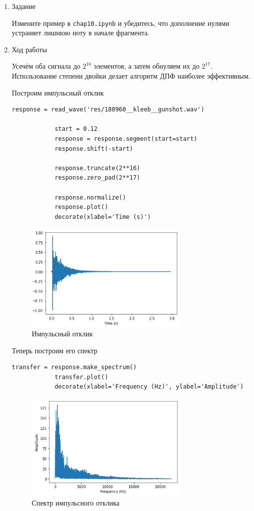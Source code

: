 \documentclass[a4paper,12pt]{article}
\begin{document}
	\begin{enumerate}
		
		\item{Задание}
		
		Измените пример в \texttt{chap10.ipynb} и убедитесь, что дополнение нулями устраняет лишнюю ноту в начале фрагмента.
		
		\item{Ход работы}
		
		Усечём оба сигнала до $2^{16}$ элементов, а затем обнуляем их до $2^{17}$. Использование степени двойки делает алгоритм ДПФ наиболее эффективным.
		
		Построим импульсный отклик
		\begin{lstlisting}[caption=Импульсный отклик]
			response = read_wave('res/180960__kleeb__gunshot.wav')
			
			start = 0.12
			response = response.segment(start=start)
			response.shift(-start)
			
			response.truncate(2**16)
			response.zero_pad(2**17)
			
			response.normalize()
			response.plot()
			decorate(xlabel='Time (s)')
		\end{lstlisting}
		\begin{figure}[H]
			\centering
			\includegraphics[width=0.75\textwidth]{1_1.png}
			\caption{Импульсный отклик}
			\label{fig:1.1}
		\end{figure}
		
		Теперь построим его спектр
		\begin{lstlisting}[caption=Спектр импульсного отклика]
			transfer = response.make_spectrum()
			transfer.plot()
			decorate(xlabel='Frequency (Hz)', ylabel='Amplitude')
		\end{lstlisting}
		\begin{figure}[H]
			\centering
			\includegraphics[width=0.75\textwidth]{1_2.png}
			\caption{Спектр импульсного отклика}
			\label{fig:1.2}
		\end{figure}
		

\end{enumerate}
\end{document}
